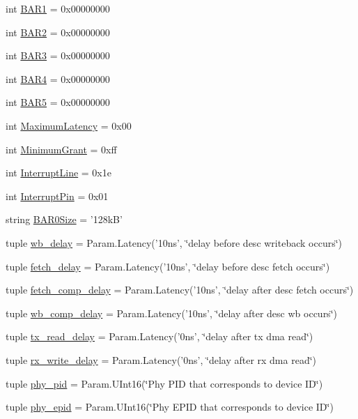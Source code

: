 \begin{DoxyCompactItemize}
int \hyperlink{classEthernet_1_1IGbE_a0d644194139bee13ebf45d34542c1dfa}{BAR1} = 0x00000000
\item 
int \hyperlink{classEthernet_1_1IGbE_a0a6f9c88531fa1221329ec6903976a8b}{BAR2} = 0x00000000
\item 
int \hyperlink{classEthernet_1_1IGbE_a0b8b6594cd17a42ee6f2bded401213d9}{BAR3} = 0x00000000
\item 
int \hyperlink{classEthernet_1_1IGbE_a563ca469426838df82cc266c302a0a70}{BAR4} = 0x00000000
\item 
int \hyperlink{classEthernet_1_1IGbE_af86e51daee4f9d86104270e5ed9a0890}{BAR5} = 0x00000000
\item 
int \hyperlink{classEthernet_1_1IGbE_a10460b79882894b983aca9f848f4ffaf}{MaximumLatency} = 0x00
\item 
int \hyperlink{classEthernet_1_1IGbE_a1f3ebd5623021488fb0bfa84f5aa357d}{MinimumGrant} = 0xff
\item 
int \hyperlink{classEthernet_1_1IGbE_a4c885b3ef4f7d1a88903aabcce7a943e}{InterruptLine} = 0x1e
\item 
int \hyperlink{classEthernet_1_1IGbE_a9b18e7e4ee8e0f835496c9106eb519d5}{InterruptPin} = 0x01
\item 
string \hyperlink{classEthernet_1_1IGbE_aefc407ca01c833e5dac341709110c5e2}{BAR0Size} = '128kB'
\item 
tuple \hyperlink{classEthernet_1_1IGbE_aaa18161ae18e293a1d71dfacac7e74d6}{wb\_\-delay} = Param.Latency('10ns', \char`\"{}delay before desc writeback occurs\char`\"{})
\item 
tuple \hyperlink{classEthernet_1_1IGbE_a5ec3e22fb226d90eb90ec108240d90a1}{fetch\_\-delay} = Param.Latency('10ns', \char`\"{}delay before desc fetch occurs\char`\"{})
\item 
tuple \hyperlink{classEthernet_1_1IGbE_a8ea83cf2b342645e3b64cfdb0d7491ab}{fetch\_\-comp\_\-delay} = Param.Latency('10ns', \char`\"{}delay after desc fetch occurs\char`\"{})
\item 
tuple \hyperlink{classEthernet_1_1IGbE_a7c65838a08d5f401aa8fee9d8882f3ee}{wb\_\-comp\_\-delay} = Param.Latency('10ns', \char`\"{}delay after desc wb occurs\char`\"{})
\item 
tuple \hyperlink{classEthernet_1_1IGbE_ae86cdda6316f1f620627c9899497aa73}{tx\_\-read\_\-delay} = Param.Latency('0ns', \char`\"{}delay after tx dma read\char`\"{})
\item 
tuple \hyperlink{classEthernet_1_1IGbE_adc456d825e9bf9c810f517523202bec2}{rx\_\-write\_\-delay} = Param.Latency('0ns', \char`\"{}delay after rx dma read\char`\"{})
\item 
tuple \hyperlink{classEthernet_1_1IGbE_a3cdba89a4899636d7e18cc917992ca1d}{phy\_\-pid} = Param.UInt16(\char`\"{}Phy PID that corresponds to device ID\char`\"{})
\item 
tuple \hyperlink{classEthernet_1_1IGbE_aa5410782903449f47b14de3c73f6cb49}{phy\_\-epid} = Param.UInt16(\char`\"{}Phy EPID that corresponds to device ID\char`\"{})
\end{DoxyCompactItemize}


